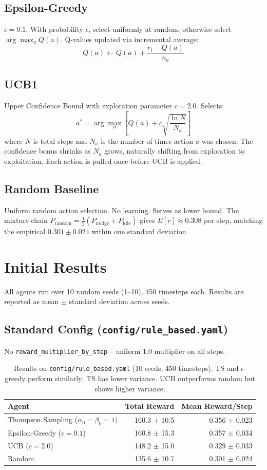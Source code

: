 \documentclass[11pt]{article}
\begin{document}
\subsection{Epsilon-Greedy}
$\epsilon = 0.1$. With probability $\epsilon$, select uniformly at random; otherwise select $\arg\max_a Q(a)$. Q-values updated via incremental average:
\[
Q(a) \leftarrow Q(a) + \frac{r_t - Q(a)}{n_a}
\]

\subsection{UCB1}
Upper Confidence Bound with exploration parameter $c = 2.0$. Selects:
\[
a^* = \arg\max_a \left[ Q(a) + c \sqrt{\frac{\ln N}{N_a}} \right]
\]
where $N$ is total steps and $N_a$ is the number of times action $a$ was chosen. The confidence bonus shrinks as $N_a$ grows, naturally shifting from exploration to exploitation. Each action is pulled once before UCB is applied.

\subsection{Random Baseline}
Uniform random action selection. No learning. Serves as lower bound.
The mixture chain $P_{\text{random}} = \tfrac{1}{2}(P_{\text{nudge}} + P_{\text{idle}})$ gives $E[r] \approx 0.308$ per step, matching the empirical $0.301 \pm 0.024$ within one standard deviation.

\section{Initial Results}

All agents run over 10 random seeds (1--10), 450 timesteps each. Results are reported as mean $\pm$ standard deviation across seeds.

\subsection{Standard Config (\texttt{config/rule\_based.yaml})}
No \texttt{reward\_multiplier\_by\_step} -- uniform 1.0 multiplier on all steps.

\begin{table}[h]
\centering
\begin{tabular}{lrr}
\toprule
Agent & Total Reward & Mean Reward/Step \\
\midrule
Thompson Sampling ($\alpha_0=\beta_0=1$) & 160.3 $\pm$ 10.5 & 0.356 $\pm$ 0.023 \\
Epsilon-Greedy ($\epsilon=0.1$) & 160.8 $\pm$ 15.3 & 0.357 $\pm$ 0.034 \\
UCB ($c=2.0$) & 148.2 $\pm$ 15.0 & 0.329 $\pm$ 0.033 \\
Random & 135.6 $\pm$ 10.7 & 0.301 $\pm$ 0.024 \\
\bottomrule
\end{tabular}
\caption{Results on \texttt{config/rule\_based.yaml} (10 seeds, 450 timesteps). TS and $\epsilon$-greedy perform similarly; TS has lower variance. UCB outperforms random but shows higher variance.}
\end{table}
\end{document}
